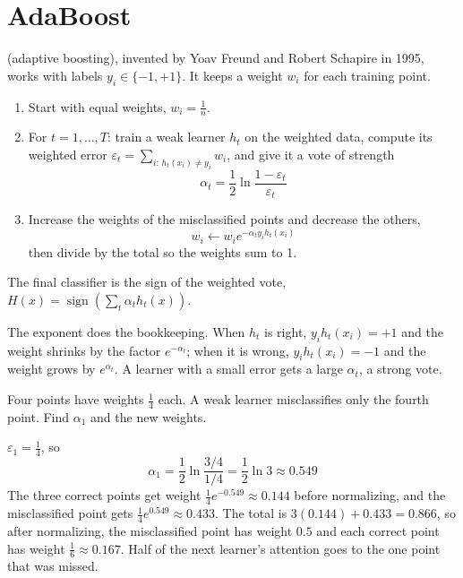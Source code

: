 \section{AdaBoost}
 (adaptive boosting), invented by Yoav Freund and Robert Schapire in 1995, works with labels
$y_i \in \{-1, +1\}$. It keeps a weight $w_i$ for each training point.
\begin{enumerate}
\item Start with equal weights, $w_i = \frac{1}{n}$.
\item For $t = 1, \ldots, T$: train a weak learner $h_t$ on the weighted data, compute its weighted error
$\varepsilon_t = \sum_{i:\, h_t(x_i) \ne y_i} w_i$, and give it a vote of strength
$$\alpha_t = \frac{1}{2}\ln\frac{1 - \varepsilon_t}{\varepsilon_t}$$
\item Increase the weights of the misclassified points and decrease the others,
$$w_i \leftarrow w_i e^{-\alpha_t y_i h_t(x_i)}$$
then divide by the total so the weights sum to 1.
\end{enumerate}
The final classifier is the sign of the weighted vote, $H(x) = \operatorname{sign}\left(\sum_t \alpha_t h_t(x)\right)$.

The exponent does the bookkeeping. When $h_t$ is right, $y_i h_t(x_i) = +1$ and the weight shrinks by the factor
$e^{-\alpha_t}$; when it is wrong, $y_i h_t(x_i) = -1$ and the weight grows by $e^{\alpha_t}$. A learner with a small
error gets a large $\alpha_t$, a strong vote.

\begin{Worked}
\begin{Problem}
Four points have weights $\frac{1}{4}$ each. A weak learner misclassifies only the fourth point.
Find $\alpha_1$ and the new weights.
\end{Problem}
\begin{Solution}
$\varepsilon_1 = \frac{1}{4}$, so
$$\alpha_1 = \frac{1}{2}\ln\frac{3/4}{1/4} = \frac{1}{2}\ln 3 \approx 0.549$$
The three correct points get weight $\frac{1}{4} e^{-0.549} \approx 0.144$ before normalizing, and the misclassified
point gets $\frac{1}{4} e^{0.549} \approx 0.433$. The total is $3(0.144) + 0.433 = 0.866$, so after normalizing, the
misclassified point has weight $0.5$ and each correct point has weight $\frac{1}{6} \approx 0.167$. Half of the
next learner's attention goes to the one point that was missed.
\end{Solution}
\end{Worked}

